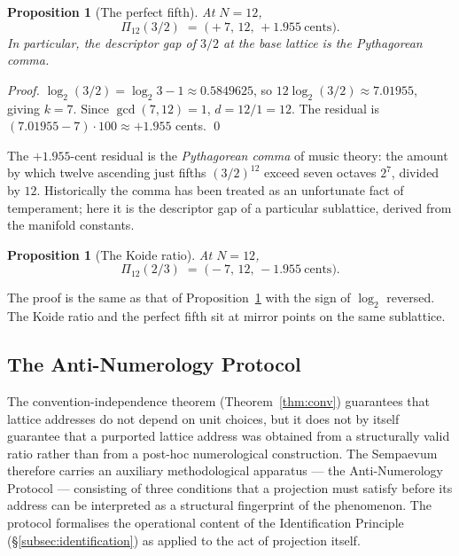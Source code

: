 \documentclass[11pt,a4paper]{article}
\newtheorem{proposition}[theorem]{Proposition}
\theoremstyle{definition}
\theoremstyle{remark}
\begin{document}
\begin{proposition}[The perfect fifth]\label{prop:fifth}
At $N=12$,
\[
\Pi_{12}(3/2) \;=\; \bigl(+7,\,12,\,+1.955\ \text{cents}\bigr).
\]
In particular, the descriptor gap of $3/2$ at the base lattice is the Pythagorean comma.
\end{proposition}

\begin{proof}
$\log_{2}(3/2) = \log_{2}3 - 1 \approx 0.5849625$, so $12\log_{2}(3/2) \approx 7.01955$, giving $k=7$. Since $\gcd(7,12)=1$, $d=12/1=12$. The residual is $(7.01955 - 7)\cdot 100 \approx +1.955$ cents. \qed
\end{proof}

The $+1.955$-cent residual is the \emph{Pythagorean comma} of music theory: the amount by which twelve ascending just fifths $(3/2)^{12}$ exceed seven octaves $2^{7}$, divided by $12$. Historically the comma has been treated as an unfortunate fact of temperament; here it is the descriptor gap of a particular sublattice, derived from the manifold constants.

\begin{proposition}[The Koide ratio]\label{prop:koide}
At $N=12$,
\[
\Pi_{12}(2/3) \;=\; \bigl(-7,\,12,\,-1.955\ \text{cents}\bigr).
\]
\end{proposition}

The proof is the same as that of Proposition~\ref{prop:fifth} with the sign of $\log_{2}$ reversed. The Koide ratio and the perfect fifth sit at mirror points on the same sublattice.

\subsection{The Anti-Numerology Protocol}\label{subsec:anti-numerology}

The convention-independence theorem (Theorem~\ref{thm:conv}) guarantees that lattice addresses do not depend on unit choices, but it does not by itself guarantee that a purported lattice address was obtained from a structurally valid ratio rather than from a post-hoc numerological construction. The Sempaevum therefore carries an auxiliary methodological apparatus --- the Anti-Numerology Protocol --- consisting of three conditions that a projection must satisfy before its address can be interpreted as a structural fingerprint of the phenomenon. The protocol formalises the operational content of the Identification Principle (\S\ref{subsec:identification}) as applied to the act of projection itself.
\end{document}
